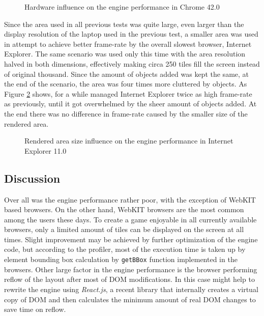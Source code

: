 \documentclass[11pt,oneside, final]{fithesis2}
\begin{document}
\begin{figure}[h]
	\centering
	
	\caption{Hardware influence on the engine performance in Chrome 42.0}
	\label{performance-hw}
\end{figure}

Since the area used in all previous tests was quite large, even larger than the display resolution of the laptop used in the previous test, a smaller area was used in attempt to achieve better frame-rate by the overall slowest browser, Internet Explorer. The same scenario was used only this time with the area resolution halved in both dimensions, effectively making circa 250 tiles fill the screen instead of original thousand. Since the amount of objects added was kept the same, at the end of the scenario, the area was four times more cluttered by objects. As Figure \ref{performance-size} shows, for a while managed Internet Explorer twice as high frame-rate as previously, until it got overwhelmed by the sheer amount of objects added. At the end there was no difference in frame-rate caused by the smaller size of the rendered area.

\begin{figure}[h]
	\centering
	
	\caption{Rendered area size influence on the engine performance in Internet Explorer 11.0}
	\label{performance-size}
\end{figure}

\subsection{Discussion}
Over all was the engine performance rather poor, with the exception of WebKIT based browsers. On the other hand, WebKIT browsers are the most common among the users these days\cite{browserstats}. To create a game enjoyable in all currently available browsers, only a limited amount of tiles can be displayed on the screen at all times. Slight improvement may be achieved by further optimization of the engine code, but according to the profiler, most of the execution time is taken up by element bounding box calculation by \texttt{getBBox} function implemented in the browsers\cite{svgtypes}. Other large factor in the engine performance is the browser performing reflow of the layout after most of DOM modifications. In this case might help to rewrite the engine using \emph{React.js}, a recent library that internally creates a virtual copy of DOM and then calculates the minimum amount of real DOM changes to save time on reflow\cite{sobo}.
\end{document}
